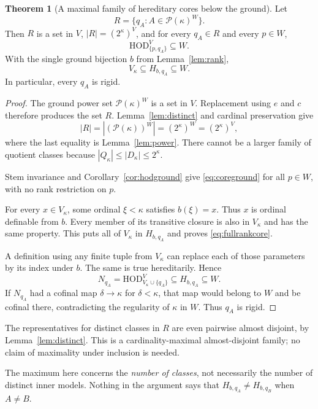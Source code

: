 \documentclass[11pt,letterpaper]{article}
\theoremstyle{definition}
\newtheorem{theorem}[definition]{Theorem}
\numberwithin{equation}{section}
\newcommand{\HOD}{\mathrm{HOD}}
\newcommand{\Pow}{\mathcal P}
\begin{document}
\begin{theorem}[A maximal family of hereditary cores below the ground]\label{thm:maximal}
Let
\[
R=\{q_A:A\in\Pow(\kappa)^W\}.
\]
Then $R$ is a set in $V$, $|R|=(2^\kappa)^V$, and for every $q_A\in R$ and every $p\in W$,
\begin{equation}\label{eq:coreground}
\HOD_{\{p,q_A\}}^V\subseteq W.
\end{equation}
With the single ground bijection $b$ from Lemma~\ref{lem:rank},
\begin{equation}\label{eq:fullrankcore}
V_\kappa\subseteq H_{b,q_A}\subseteq W.
\end{equation}
In particular, every $q_A$ is rigid.
\end{theorem}
\begin{proof}
The ground power set $\Pow(\kappa)^W$ is a set in $V$. Replacement using $e$ and $c$ therefore produces the set $R$. Lemma~\ref{lem:distinct} and cardinal preservation give
\[
|R|=|(\Pow(\kappa))^W|=(2^\kappa)^W=(2^\kappa)^V,
\]
where the last equality is Lemma~\ref{lem:power}. There cannot be a larger family of quotient classes because $|Q_\kappa|\le|D_\kappa|\le2^\kappa$.

Stem invariance and Corollary~\ref{cor:hodground} give \eqref{eq:coreground} for all $p\in W$, with no rank restriction on $p$.

For every $x\in V_\kappa$, some ordinal $\xi<\kappa$ satisfies $b(\xi)=x$. Thus $x$ is ordinal definable from $b$. Every member of its transitive closure is also in $V_\kappa$ and has the same property. This puts all of $V_\kappa$ in $H_{b,q_A}$ and proves \eqref{eq:fullrankcore}.

A definition using any finite tuple from $V_\kappa$ can replace each of those parameters by its index under $b$. The same is true hereditarily. Hence
\[
N_{q_A}=\HOD_{V_\kappa\cup\{q_A\}}^V\subseteq H_{b,q_A}\subseteq W.
\]
If $N_{q_A}$ had a cofinal map $\delta\to\kappa$ for $\delta<\kappa$, that map would belong to $W$ and be cofinal there, contradicting the regularity of $\kappa$ in $W$. Thus $q_A$ is rigid.
\end{proof}

The representatives for distinct classes in $R$ are even pairwise almost disjoint, by Lemma~\ref{lem:distinct}. This is a cardinality-maximal almost-disjoint family; no claim of maximality under inclusion is needed.

The maximum here concerns the \emph{number of classes}, not necessarily the number of distinct inner models. Nothing in the argument says that $H_{b,q_A}\ne H_{b,q_B}$ when $A\ne B$.
\end{document}

